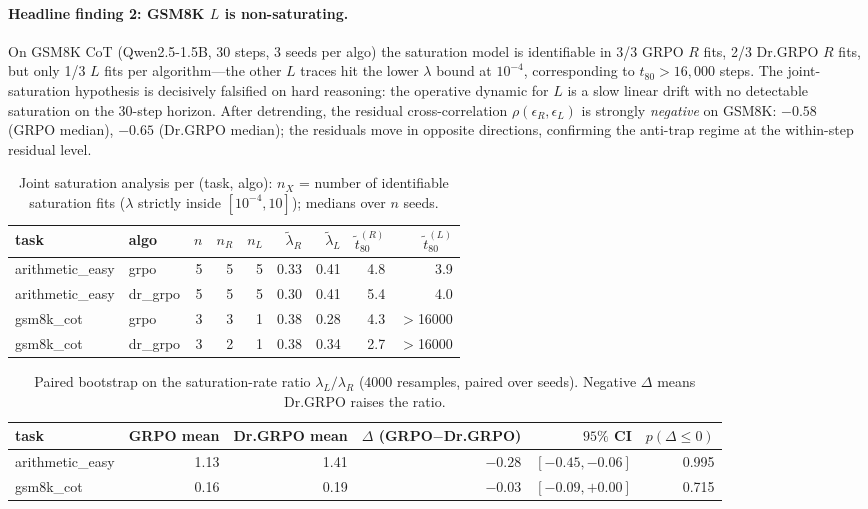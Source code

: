 \documentclass{article}
\begin{document}
\paragraph{Headline finding 2: GSM8K $L$ is non-saturating.}
On GSM8K CoT (Qwen2.5-1.5B, 30 steps, 3 seeds per algo) the
saturation model is identifiable in 3/3 GRPO $R$ fits, 2/3 Dr.GRPO
$R$ fits, but only 1/3 $L$ fits per algorithm---the other $L$ traces
hit the lower $\lambda$ bound at $10^{-4}$, corresponding to
$t_{80} > 16{,}000$ steps. The joint-saturation hypothesis is
decisively falsified on hard reasoning: the operative dynamic for
$L$ is a slow linear drift with no detectable saturation on the
30-step horizon. After detrending, the residual cross-correlation
$\rho(\epsilon_R, \epsilon_L)$ is strongly \emph{negative} on GSM8K:
$-0.58$ (GRPO median), $-0.65$ (Dr.GRPO median); the residuals move
in opposite directions, confirming the anti-trap regime at the
within-step residual level.

\begin{table}[t]
\centering
\small
\caption{Joint saturation analysis per (task, algo): $n_X$ = number of
identifiable saturation fits ($\lambda$ strictly inside
$[10^{-4}, 10]$); medians over $n$ seeds.}
\label{tab:length-iter36-summary}
\begin{tabular}{llrrrrrrr}
\toprule
task & algo & $n$ & $n_R$ & $n_L$ & $\tilde\lambda_R$ &
$\tilde\lambda_L$ & $\tilde t_{80}^{(R)}$ & $\tilde t_{80}^{(L)}$ \\
\midrule
arithmetic\_easy & grpo    & 5 & 5 & 5 & 0.33 & 0.41 & 4.8 & 3.9 \\
arithmetic\_easy & dr\_grpo & 5 & 5 & 5 & 0.30 & 0.41 & 5.4 & 4.0 \\
gsm8k\_cot       & grpo    & 3 & 3 & 1 & 0.38 & 0.28 & 4.3 & $>$16000 \\
gsm8k\_cot       & dr\_grpo & 3 & 2 & 1 & 0.38 & 0.34 & 2.7 & $>$16000 \\
\bottomrule
\end{tabular}
\end{table}

\begin{table}[t]
\centering
\small
\caption{Paired bootstrap on the saturation-rate ratio
$\lambda_L / \lambda_R$ (4000 resamples, paired over seeds). Negative
$\Delta$ means Dr.GRPO raises the ratio.}
\label{tab:length-iter36-cross}
\begin{tabular}{lrrrrr}
\toprule
task & GRPO mean & Dr.GRPO mean & $\Delta$ (GRPO$-$Dr.GRPO) &
$95\%$ CI & $p(\Delta \le 0)$ \\
\midrule
arithmetic\_easy & 1.13 & 1.41 & $-0.28$ & $[-0.45, -0.06]$ & 0.995 \\
gsm8k\_cot       & 0.16 & 0.19 & $-0.03$ & $[-0.09, +0.00]$ & 0.715 \\
\bottomrule
\end{tabular}
\end{table}
\end{document}
